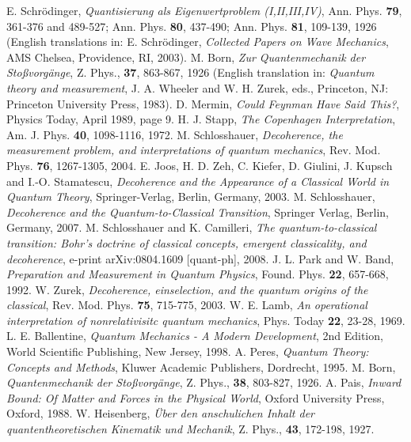 \documentclass [12pt]{revtex4}
\begin{document}
\begin{thebibliography}{99}

 E. Schr\"{o}dinger, {\it Quantisierung als Eigenwertproblem (I,II,III,IV)}, Ann. Phys. \textbf{79}, 361-376 and 489-527; Ann. Phys. \textbf{80}, 437-490; Ann. Phys. \textbf{81}, 109-139, 1926 (English translations in: E. Schr\"{o}dinger, {\it Collected Papers on Wave Mechanics}, AMS Chelsea, Providence, RI, 2003).
 M. Born, {\it Zur Quantenmechanik der Sto{\ss}vorg\"{a}nge}, Z. Phys., \textbf{37}, 863-867, 1926 (English translation in: {\it Quantum theory and measurement}, J. A. Wheeler and W. H. Zurek, eds., Princeton, NJ: Princeton University Press, 1983).
 D. Mermin, {\it Could Feynman Have Said This?}, Physics Today, April 1989, page 9.
 H. J. Stapp, {\it The Copenhagen Interpretation}, Am.
    J. Phys. \textbf{40}, 1098-1116, 1972.
 M. Schlosshauer, {\it Decoherence, the measurement problem, and interpretations of quantum mechanics}, Rev. Mod. Phys. \textbf{76}, 1267-1305, 2004.
 E. Joos, H. D. Zeh, C. Kiefer, D. Giulini, J. Kupsch and I.-O. Stamatescu, {\it Decoherence and the Appearance of a Classical World in Quantum Theory}, Springer-Verlag, Berlin, Germany, 2003.
 M. Schlosshauer, {\it Decoherence and the Quantum-to-Classical Transition}, Springer Verlag, Berlin, Germany, 2007.
 M. Schlosshauer and K. Camilleri, {\it The quantum-to-classical transition: Bohr's doctrine of classical concepts, emergent classicality, and decoherence}, e-print arXiv:0804.1609 [quant-ph], 2008.
 J. L. Park and W. Band, {\it Preparation and Measurement in Quantum Physics}, Found. Phys. \textbf{22}, 657-668, 1992.
 W. Zurek, {\it Decoherence, einselection, and the quantum origins of the classical}, Rev. Mod. Phys. \textbf{75}, 715-775, 2003.
 W. E. Lamb, {\it An operational interpretation of nonrelativisitc quantum mechanics}, Phys. Today \textbf{22}, 23-28, 1969.
 L. E. Ballentine, {\it Quantum Mechanics - A Modern Development}, 2nd Edition, World Scientific Publishing, New Jersey, 1998.
 A. Peres, {\it Quantum Theory: Concepts and Methods}, Kluwer Academic Publishers, Dordrecht, 1995.
 M. Born, {\it Quantenmechanik der Sto{\ss}vorg\"{a}nge}, Z. Phys., \textbf{38}, 803-827, 1926.
 A. Pais, {\it Inward Bound: Of Matter and Forces in the Physical World}, Oxford University Press, Oxford, 1988.
 W. Heisenberg, {\it \"{U}ber den anschulichen Inhalt der quantentheoretischen Kinematik und Mechanik}, Z. Phys., \textbf{43}, 172-198, 1927.

\end{thebibliography}
\end{document}
